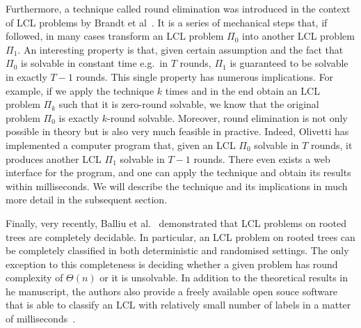 Furthermore, a technique called round elimination was introduced in the context
of LCL problems by Brandt et al~\cite{Brandt2019}. It is a series of mechanical
steps that, if followed, in many cases transform an LCL problem $\Pi_0$ into another LCL problem $\Pi_1$. An interesting property is that, given certain assumption and the fact that
$\Pi_0$ is solvable in constant time e.g.\ in $T$ rounds, $\Pi_1$ is guaranteed to be
solvable in exactly $T - 1$ rounds. This single property has numerous implications.
For example, if we apply the technique $k$ times and in the end obtain an LCL problem $\Pi_k$
such that it is zero-round solvable, we know that the original problem $\Pi_0$ is
exactly $k$-round solvable. Moreover, round elimination is not only possible
in theory but is also very much feasible in practive. Indeed, Olivetti has
implemented a computer program that, given an LCL $\Pi_0$ solvable in $T$ rounds,
it produces another LCL $\Pi_1$ solvable in $T - 1$ rounds. There even exists
a web interface for the program, and one can apply the technique and obtain
its results within milliseconds. We will describe the technique and its implications
in much more detail in the subsequent section.

Finally, very recently, Balliu et al.~\cite{Balliu2021} demonstrated
that LCL problems on rooted trees are completely decidable.
In particular, an LCL problem on rooted trees can be completely
classified in both deterministic and randomised settings. The only
exception to this completeness is deciding whether a given problem
has round complexity of $\Theta(n)$ or it is unsolvable. In addition
to the theoretical results in he manuscript, the authors also
provide a freely available open souce software that is able to
classify an LCL with relatively small number of labels in a matter
of milliseconds~\cite{Studeny2021}.
